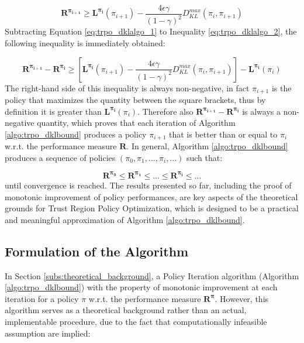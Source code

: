                 \begin{equation}
                    \label{eq:trpo_dklalgo_2}
                    \mathbf{R^{\pi_{i+1}}} \geq \mathbf{L^{\pi_{i}}}(\pi_{i+1}) - \frac{4 \epsilon \gamma}{\left( 1 - \gamma \right)^2} D_{KL}^{max}(\pi_{i}, \pi_{i+1})
                \end{equation}
                \noindent
                Subtracting Equation \ref{eq:trpo_dklalgo_1} to Inequality \ref{eq:trpo_dklalgo_2}, the following inequality is immediately obtained:
                
                \begin{equation}
                    \label{eq:trpo_dklalgo_3}
                    \mathbf{R^{\pi_{i+1}}} - \mathbf{R^{\pi_{i}}} \geq \left[ \mathbf{L^{\pi_{i}}}(\pi_{i+1}) - \frac{4 \epsilon \gamma}{\left( 1 - \gamma \right)^2} D_{KL}^{max}(\pi_{i}, \pi_{i+1}) \right] - \mathbf{L^{\pi_{i}}}(\pi_{i})
                \end{equation}
                \noindent
                The right-hand side of this inequality is always non-negative, in fact $\pi_{i+1}$ is the policy that maximizes the quantity between the square brackets, thus by definition it is greater than $\mathbf{L^{\pi_{i}}}(\pi_{i})$. Therefore also $\mathbf{R^{\pi_{i+1}}} - \mathbf{R^{\pi_{i}}}$ is always a non-negative quantity, which proves that each iteration of Algorithm \ref{algo:trpo_dklbound} produces a policy $\pi_{i+1}$ that is better than or equal to $\pi_{i}$ w.r.t. the performance measure $\mathbf{R}$. In general, Algorithm \ref{algo:trpo_dklbound} produces a sequence of policies $(\pi_{0}, \pi_{1}, ..., \pi_{i}, ...)$ such that:
                
                \begin{equation}
                    \label{eq:trpo_dklalgo_4}
                    \mathbf{R^{\pi_{0}}} \leq \mathbf{R^{\pi_{1}}} \leq ... \leq \mathbf{R^{\pi_{i}}} \leq ...
                \end{equation}
                until convergence is reached. \newline
                The results presented so far, including the proof of  monotonic improvement of policy performances, are key aspects of the theoretical grounds for Trust Region Policy Optimization, which is designed to be a practical and meaningful approximation of Algorithm \ref{algo:trpo_dklbound}.
        
        \subsection{Formulation of the Algorithm}
        \label{subs:trpo_algorithm}
            In Section \ref{subs:theoretical_background}, a Policy Iteration algorithm (Algorithm \ref{algo:trpo_dklbound}) with the property of monotonic improvement at each iteration for a policy $\pi$ w.r.t. the performance measure $\mathbf{R^{\pi}}$. However, this algorithm serves as a theoretical background rather than an actual, implementable procedure, due to the fact that computationally infeasible assumption are implied:
            
